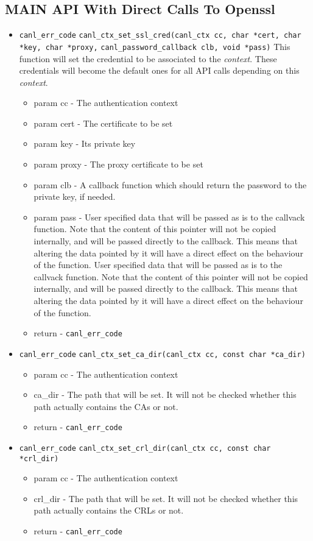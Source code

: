 \subsection{MAIN API With Direct Calls To Openssl}

\begin{itemize}
  \item \verb'canl_err_code'
  \verb'canl_ctx_set_ssl_cred(canl_ctx cc, char *cert, char *key, char *proxy,'
  \verb'canl_password_callback clb, void *pass)' This function 
  will set the credential to be associated to the \textit{context}.  These
  credentials will become the default ones for all API calls 
  depending on this \textit{context}.
  \begin{itemize}
    \item param cc - The authentication context
    \item param cert - The certificate to be set
    \item param key - Its private key
    \item param proxy - The proxy certificate to be set
    \item param clb - A callback function which should return 
    the password to the private key, if needed.
    \item param pass - User specified data that will be passed 
    as is to the callvack function.  Note that the content of this 
    pointer will not be copied internally, and will be passed
    directly to the callback.  This means that altering the 
    data pointed by it will have
    a direct effect on the behaviour of the function. User specified 
    data that will be passed as is to the callvack function.  Note that
    the content of this pointer will not be copied internally, and 
    will be passed
    directly to the callback.  This means that altering the data 
    pointed by it will have a direct effect on the behaviour of the function.
    \item return - \verb'canl_err_code'
  \end{itemize}
  \item \verb'canl_err_code'
  \verb'canl_ctx_set_ca_dir(canl_ctx cc, const char *ca_dir)'
    \begin{itemize} 
    \item param cc - The authentication context
    \item ca\_dir - The path that will be set.  It will not be 
    checked whether this path actually contains the CAs or not.
    \item return - \verb'canl_err_code'
    \end{itemize}
  \item \verb'canl_err_code'
  \verb'canl_ctx_set_crl_dir(canl_ctx cc, const char *crl_dir)'
    \begin{itemize} 
    \item param cc - The authentication context
    \item crl\_dir - The path that will be set.  It will not be 
    checked whether this path actually contains the CRLs or not.
    \item return - \verb'canl_err_code'
    \end{itemize}

\end{itemize}
